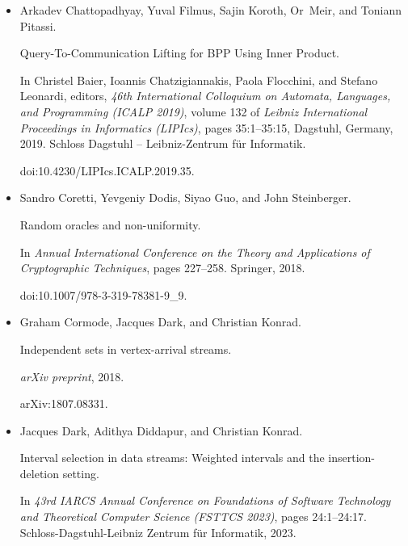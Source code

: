 \documentclass[10pt,a4paper]{article}
\begin{document}
\begin{itemize}
doi:10.1137/1.9781611974331.CH94.





\item[] 
[19]

Arkadev Chattopadhyay, Yuval Filmus, Sajin Koroth, Or Meir, and Toniann
Pitassi.


Query-To-Communication Lifting for BPP Using Inner Product.


In Christel Baier, Ioannis Chatzigiannakis, Paola Flocchini, and
Stefano Leonardi, editors, \emph{46th International Colloquium on Automata,
Languages, and Programming (ICALP 2019)}, volume 132 of \emph{Leibniz
International Proceedings in Informatics (LIPIcs)}, pages 35:1–35:15,
Dagstuhl, Germany, 2019. Schloss Dagstuhl – Leibniz-Zentrum für
Informatik.


doi:10.4230/LIPIcs.ICALP.2019.35.





\item[] 
[20]

Sandro Coretti, Yevgeniy Dodis, Siyao Guo, and John Steinberger.


Random oracles and non-uniformity.


In \emph{Annual International Conference on the Theory and
Applications of Cryptographic Techniques}, pages 227–258. Springer, 2018.


doi:10.1007/978-3-319-78381-9\_9.





\item[] 
[21]

Graham Cormode, Jacques Dark, and Christian Konrad.


Independent sets in vertex-arrival streams.


\emph{arXiv preprint}, 2018.


arXiv:1807.08331.





\item[] 
[22]

Jacques Dark, Adithya Diddapur, and Christian Konrad.


Interval selection in data streams: Weighted intervals and the
insertion-deletion setting.


In \emph{43rd IARCS Annual Conference on Foundations of Software
Technology and Theoretical Computer Science (FSTTCS 2023)}, pages
24:1–24:17. Schloss-Dagstuhl-Leibniz Zentrum für Informatik, 2023.



\end{itemize}
\end{document}

